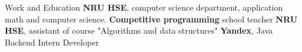 \begin{rubric}{Work and Education}
\entry*[\textbf{2019 -- 2023}]
	\textbf{NRU HSE}, computer science department, application math and computer science.
\entry*[\textbf{2019 -- 2020}]
	\textbf{Competitive programming} school teacher
\entry*[\textbf{2020 -- 2021}]
    \textbf{NRU HSE}, assistant of course "Algorithms and data structures"
	\textbf{Yandex}, Java Backend Intern Developer
\end{rubric}